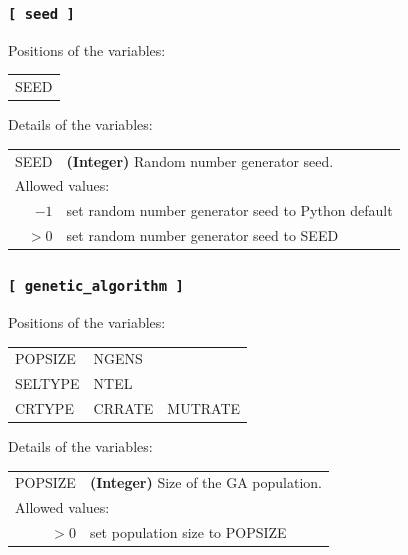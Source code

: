 \documentclass[10pt,a4paper,openany]{memoir}
\numberwithin{equation}{section}
\begin{document}
\subsubsection{\texttt{[~seed~]}}
\label{sec:inp-seed}

Positions of the variables:
\begin{center}
  \begin{tabular}{l}
    SEED
  \end{tabular}
\end{center}

\noindent Details of the variables:
\vspace{2ex}

{
\begin{tabular}{r@{ : }l}
\label{descr:seed}
      SEED&\textbf{(Integer)} Random number generator seed.                                                                        \\ 
\multicolumn{2}{l}{Allowed values:} \\ 
    \(-1\)&set random number generator seed to Python default                                                  \\ 
    \(>0\)&set random number generator seed to SEED                                                             \\ 
\end{tabular}
\vspace{1ex}
}

\subsubsection{\texttt{[~genetic\_algorithm~]}}
\label{sec:inp-ga}

Positions of the variables:
\begin{center}
  \begin{tabular}{lll}
    POPSIZE & NGENS & \\
    SELTYPE & NTEL & \\
    CRTYPE & CRRATE & MUTRATE \\
  \end{tabular}
\end{center}

\noindent Details of the variables:
\vspace{2ex}

{
\begin{tabular}{r@{ : }l}
\label{descr:popsize}
   POPSIZE&\textbf{(Integer)} Size of the GA population.                                                                           \\ 
\multicolumn{2}{l}{Allowed values:} \\ 
    \(>0\)&set population size to POPSIZE                                                                       \\ 
\end{tabular}
\vspace{1ex}
}
\end{document}
